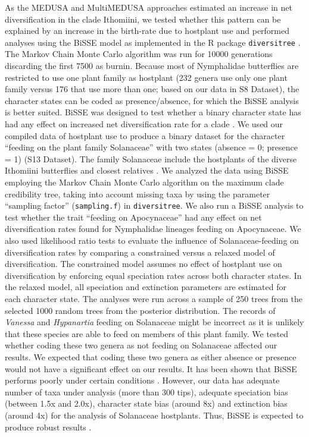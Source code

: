 \documentclass[10pt,letterpaper]{article}
\begin{document}
As the MEDUSA and MultiMEDUSA approaches estimated an increase in net
diversification in the clade Ithomiini, we tested whether this pattern
can be explained by an increase in the birth-rate due to hostplant use
and performed analyses using the BiSSE model \cite{maddison2007} 
as implemented in the R package
\texttt{diversitree} \cite{fitzjohn2012}. The Markov Chain Monte Carlo algorithm
was run for 10000 generations discarding the first 7500 as burnin.
Because most of Nymphalidae butterflies are restricted to
use one plant family as hostplant (232 genera use only one plant family
versus 176 that use more than one; based on our data in S8 Dataset),
the character states can be coded as presence/absence, for which the
BiSSE analysis is better suited. BiSSE was designed to test whether a
binary character state has had any effect on increased net
diversification rate for a clade \cite{maddison2007}. We used our compiled data
of hostplant use to produce a binary dataset for the character ``feeding on
the plant family Solanaceae'' with two states (absence = 0; presence =
1) (S13 Dataset). The family Solanaceae include the hostplants of the
diverse Ithomiini butterflies and closest relatives \cite{willmott2006}. 
We analyzed the data using BiSSE employing the Markov Chain
Monte Carlo algorithm on the maximum clade credibility tree, taking into
account missing taxa by using the parameter ``sampling factor''
(\texttt{sampling.f}) in \texttt{diversitree}. 
We also run a BiSSE analysis
to test whether the trait ``feeding on Apocynaceae'' had any effect on
net diversification rates found for Nymphalidae lineages feeding on
Apocynaceae.
We also used likelihood ratio tests to evaluate the influence of
Solanaceae-feeding on diversification rates by comparing a constrained versus
a relaxed model of diversification.
The constrained model assumes no effect of hostplant use on diversification by
enforcing equal speciation rates across both character states. In the relaxed
model, all speciation and extinction parameters are estimated for each
character state.
The analyses were run across a sample of 250
trees from the selected 1000 random trees from the posterior
distribution. The records of \emph{Vanessa} and \emph{Hypanartia}
feeding on Solanaceae \cite{beccaloni2008, scott1986} might be incorrect as it is unlikely
that these species are able to feed on members of this plant family. We tested
whether coding these two genera as not feeding on Solanaceae affected
our results. We expected that coding these two genera as either absence
or presence would not have a significant effect on our results. It has
been shown that BiSSE performs poorly under certain conditions \cite{davis2013}.
However, our data has adequate number of taxa under analysis (more than
300 tips), adequate speciation bias (between 1.5x and 2.0x), character
state bias (around 8x) and extinction bias (around 4x) for the analysis
of Solanaceae hostplants. Thus, BiSSE is expected to produce robust
results \cite{davis2013}.
\end{document}

